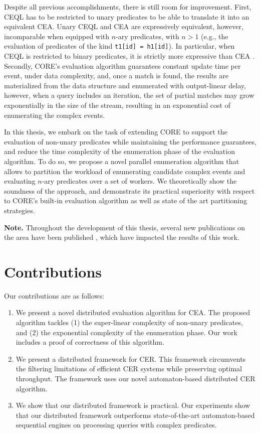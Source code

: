 Despite all previous accomplishments, there is still room for improvement. First, CEQL has to be restricted to unary predicates to be able to translate it into an equivalent CEA. Unary CEQL and CEA are expressively equivalent, however, incomparable when equipped with $n$-ary predicates, with $n > 1$ (e.g., the evaluation of predicates of the kind \texttt{t1[id] = h1[id]}). In particular, when CEQL is restricted to binary predicates, it is strictly more expressive than CEA \cite{on-the-expressiveness}. Secondly, CORE's evaluation algorithm guarantees constant update time per event, under data complexity, and, once a match is found, the results are materialized from the data structure and enumerated with output-linear delay, however, when a query includes an iteration, the set of partial matches may grow exponentially in the size of the stream, resulting in an exponential cost of enumerating the complex events.

In this thesis, we embark on the task of extending CORE to support the evaluation of non-unary predicates while maintaining the performance guarantees, and reduce the time complexity of the enumeration phase of the evaluation algorithm. To do so, we propose a novel parallel enumeration algorithm that allows to partition the workload of enumerating candidate complex events and evaluating $n$-ary predicates over a set of workers. We theoretically show the soundness of the approach, and demonstrate its practical superiority with respect to CORE's built-in evaluation algorithm as well as state of the art partitioning strategies.

\textbf{Note.} Throughout the development of this thesis, several new publications on the area have been published \cite{formal-framework-cer, core}, which have impacted the results of this work.

\section{Contributions}
\label{sec:contribution}

Our contributions are as follows:

\begin{enumerate}[label=(\roman*)]
  \item We present a novel distributed evaluation algorithm for CEA. The proposed algorithm tackles (1) the super-linear complexity of non-unary predicates, and (2) the exponential complexity of the enumeration phase. Our work includes a proof of correctness of this algorithm.

  \item We present a distributed framework for CER. This framework circumvents the filtering limitations of efficient CER systems while preserving optimal throughput. The framework uses our novel automaton-based distributed CER algorithm.

  \item We show that our distributed framework is practical. Our experiments show that our distributed framework outperforms state-of-the-art automaton-based sequential engines on processing queries with complex predicates.
\end{enumerate}

